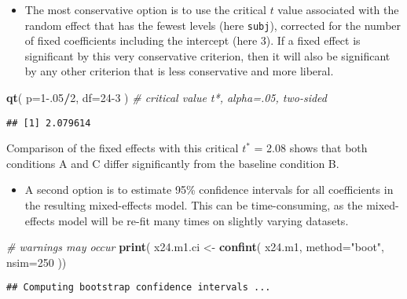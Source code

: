 \documentclass[]{book}
\newenvironment{Shaded}{\begin{snugshade}}{\end{snugshade}}
\newcommand{\CommentTok}[1]{\textcolor[rgb]{0.56,0.35,0.01}{\textit{#1}}}
\newcommand{\DataTypeTok}[1]{\textcolor[rgb]{0.13,0.29,0.53}{#1}}
\newcommand{\DecValTok}[1]{\textcolor[rgb]{0.00,0.00,0.81}{#1}}
\newcommand{\FloatTok}[1]{\textcolor[rgb]{0.00,0.00,0.81}{#1}}
\newcommand{\KeywordTok}[1]{\textcolor[rgb]{0.13,0.29,0.53}{\textbf{#1}}}
\newcommand{\NormalTok}[1]{#1}
\newcommand{\OperatorTok}[1]{\textcolor[rgb]{0.81,0.36,0.00}{\textbf{#1}}}
\newcommand{\StringTok}[1]{\textcolor[rgb]{0.31,0.60,0.02}{#1}}
\providecommand{\tightlist}{%
  \setlength{\itemsep}{0pt}\setlength{\parskip}{0pt}}
\begin{document}
\begin{itemize}
\tightlist
\item
  The most conservative option \citep{HMS18} is to use the critical \(t\) value
  associated with the random effect that has the fewest levels (here
  \texttt{subj}), corrected for the number of fixed
  coefficients including the intercept (here \(3\)).
  If a fixed effect is significant by this very
  conservative criterion, then it will also be significant by any other
  criterion that is less conservative and more liberal.
\end{itemize}

\begin{Shaded}
\begin{Highlighting}[]
\KeywordTok{qt}\NormalTok{( }\DataTypeTok{p=}\DecValTok{1}\FloatTok{-.05}\OperatorTok{/}\DecValTok{2}\NormalTok{, }\DataTypeTok{df=}\DecValTok{24-3}\NormalTok{ ) }\CommentTok{# critical value t*, alpha=.05, two-sided}
\end{Highlighting}
\end{Shaded}

\begin{verbatim}
## [1] 2.079614
\end{verbatim}

Comparison of the fixed effects with this critical \(t^*\) = 2.08 shows that
both conditions A and C differ significantly from the baseline condition
B.

\begin{itemize}
\tightlist
\item
  A second option is to estimate 95\% confidence intervals for all
  coefficients in the resulting mixed-effects model. This can be
  time-consuming, as the mixed-effects model will be re-fit many times on
  slightly varying datasets.
\end{itemize}

\begin{Shaded}
\begin{Highlighting}[]
\CommentTok{# warnings may occur}
\KeywordTok{print}\NormalTok{( x24.m1.ci <-}\StringTok{ }\KeywordTok{confint}\NormalTok{( x24.m1, }\DataTypeTok{method=}\StringTok{"boot"}\NormalTok{, }\DataTypeTok{nsim=}\DecValTok{250}\NormalTok{ ))}
\end{Highlighting}
\end{Shaded}

\begin{verbatim}
## Computing bootstrap confidence intervals ...
\end{verbatim}
\end{document}
